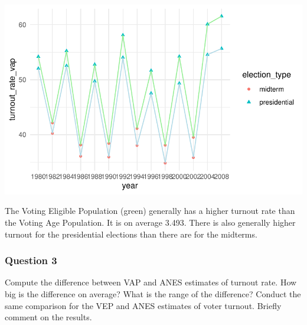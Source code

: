 \documentclass[
  letterpaper,
  DIV=11,
  numbers=noendperiod]{scrartcl}
\begin{document}
\begin{center}
\includegraphics{class-1_files/figure-pdf/unnamed-chunk-4-1.pdf}
\end{center}

The Voting Eligible Population (green) generally has a higher turnout
rate than the Voting Age Population. It is on average 3.493. There is
also generally higher turnout for the presidential elections than there
are for the midterms.

\subsubsection{Question 3}\label{question-3}

Compute the difference between VAP and ANES estimates of turnout rate.
How big is the difference on average? What is the range of the
difference? Conduct the same comparison for the VEP and ANES estimates
of voter turnout. Briefly comment on the results.
\end{document}

